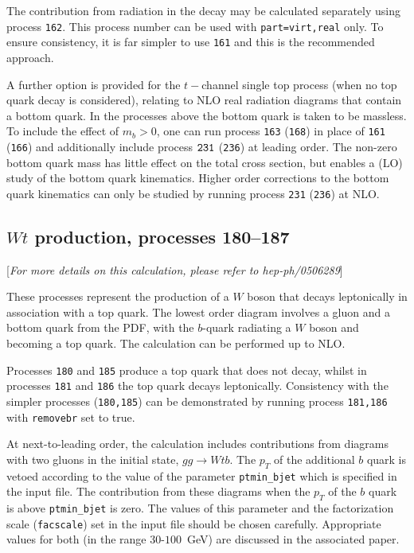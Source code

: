 \documentclass[12pt]{article}
\begin{document}
The contribution from radiation in the decay may be calculated separately using
process {\tt 162}. This process number can be used with {\tt part=virt,real}
only. To ensure consistency, it is far simpler to use {\tt 161}
and this is the recommended approach.

A further option is provided for the $t-$channel single top process (when no
top quark decay is considered), relating to NLO real radiation diagrams that
contain a bottom quark. In the processes above the bottom quark is taken to
be massless. To include the effect of $m_b > 0$, one can run process
{\tt 163} ({\tt 168}) in place of {\tt 161} ({\tt 166}) and additionally include
process $\tt 231$ ({\tt 236}) at leading order.
The non-zero bottom quark mass has little effect on
the total cross section, but enables a (LO) study of the bottom quark kinematics.
Higher order corrections to the bottom quark kinematics can only be studied by running
process {\tt 231} ({\tt 236}) at NLO.

\subsection{$Wt$ production, processes 180--187}
\label{subsec:wt}

\begin{center}
[{\it For more details on this calculation, please refer to hep-ph/0506289}]
\end{center}

These processes represent the production of a $W$ boson that decays leptonically
in association with a top quark. The lowest order diagram involves a gluon and
a bottom quark from the PDF, with the $b$-quark radiating a $W$ boson and
becoming a top quark. The calculation can be performed up to NLO.

Processes {\tt 180} and {\tt 185} produce a top quark that does not decay,
whilst in processes {\tt 181} and {\tt 186} the top quark decays leptonically.
Consistency with
the simpler processes ({\tt 180,185}) can be demonstrated by running process
{\tt 181,186} with {\tt removebr} set to true.

At next-to-leading order, the calculation includes contributions from diagrams
with two gluons in the initial state, $gg \rightarrow Wtb$. The $p_T$ of the
additional $b$ quark is vetoed according to the value of the parameter
{\tt ptmin\_bjet} which is specified in the input file. The contribution from
these diagrams when the $p_T$ of the $b$ quark is above {\tt ptmin\_bjet}
is zero. The values of this parameter and the factorization scale ({\tt facscale})
set in the input file should be chosen carefully. Appropriate values for both
(in the range $30$-$100$~GeV) are discussed in the associated paper.
\end{document}
